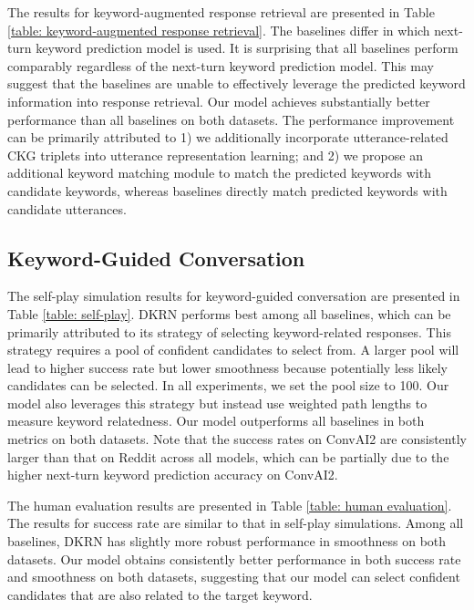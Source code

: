 \documentclass[letterpaper]{article} %
\begin{document}
The results for keyword-augmented response retrieval are presented in Table \ref{table: keyword-augmented response retrieval}. The baselines differ in which next-turn keyword prediction model is used. It is surprising that all baselines perform comparably regardless of the next-turn keyword prediction model. This may suggest that the baselines are unable to effectively leverage the predicted keyword information into response retrieval. Our model achieves substantially better performance than all baselines on both datasets. The performance improvement can be primarily attributed to 1) we additionally incorporate utterance-related CKG triplets into utterance representation learning; and 2) we propose an additional keyword matching module to match the predicted keywords with candidate keywords, whereas baselines directly match predicted keywords with candidate utterances.

\vspace{-2.26mm}
\subsection{Keyword-Guided Conversation}
\label{sec: keyword-guided conversation}
The self-play simulation results for keyword-guided conversation are presented in Table \ref{table: self-play}. DKRN performs best among all baselines, which can be primarily attributed to its strategy of selecting keyword-related responses. This strategy requires a pool of confident candidates to select from. A larger pool will lead to higher success rate but lower smoothness because potentially less likely candidates can be selected. In all experiments, we set the pool size to 100. Our model also leverages this strategy but instead use weighted path lengths to measure keyword relatedness. Our model outperforms all baselines in both metrics on both datasets. Note that the success rates on ConvAI2 are consistently larger than that on Reddit across all models, which can be partially due to the higher next-turn keyword prediction accuracy on ConvAI2.

The human evaluation results are presented in Table \ref{table: human evaluation}. The results for success rate are similar to that in self-play simulations. Among all baselines, DKRN has slightly more robust performance in smoothness on both datasets. Our model obtains consistently better performance in both success rate and smoothness on both datasets, suggesting that our model can select confident candidates that are also related to the target keyword.
\end{document}
